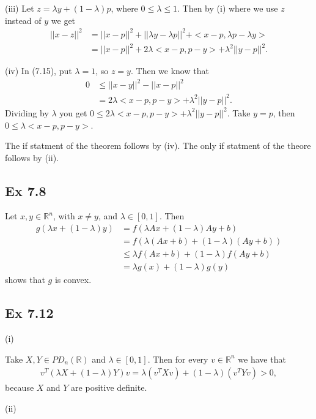\documentclass[letterpaper,12pt]{article}
\theoremstyle{definition}
\begin{document}
\begin{spacing}{1.3}{}
	(iii)
	Let $z=\lambda y+(1-\lambda)p$, where $0\leq\lambda\leq1$.
	Then by (i) where we use $z$ instead of $y$ we get
	\begin{align*}
	    ||x-z||^2 & = ||x-p||^2+||\lambda y-\lambda p||^2 + <x-p,\lambda p-\lambda y>\\
	&= ||x-p||^2+2\lambda<x-p,p-y>+\lambda^2||y-p||^2.
	\end{align*}
	
	(iv)
	In (7.15), put $\lambda=1$, so $z=y$.
	Then we know that
	\begin{align*}
	0&\leq||x-y||^2-||x-p||^2\\
	&=2\lambda<x-p,p-y>+\lambda^2||y-p||^2.
	\end{align*}
	Dividing by $\lambda$ you get $0\leq2\lambda<x-p,p-y>+\lambda^2||y-p||^2$.
	Take $y=p$, then $0\leq\lambda<x-p,p-y>$.
	
	The if statment of the theorem follows by (iv).
	The only if statment of the theore follows by (ii).
	
	\subsection*{Ex 7.8}
	Let $x, y\in\mathbb R^n$, with $x\neq y$, and $\lambda\in[0,1]$.
	Then
	\begin{align*}
	g(\lambda x+(1-\lambda)y)&= f(\lambda Ax + (1-\lambda)Ay + b)\\
	 &= f(\lambda(Ax+b) + (1-\lambda)(Ay+b))\\
	&\leq\lambda f(Ax+b) + (1-\lambda)f(Ay+b)\\
	& = \lambda g(x) + (1-\lambda)g(y)
	\end{align*}
	shows that $g$ is convex.
	
	\subsection*{Ex 7.12}
	(i)
	
	Take $X,Y\in PD_n(\mathbb R)$ and $\lambda\in[0,1]$.
	Then for every $v\in\mathbb R^n$ we have that
	\begin{align*}
	v^T(\lambda X+(1-\lambda)Y)v=
	\lambda(v^TXv)+(1-\lambda)(v^TYv)>0,
	\end{align*}
	because $X$ and $Y$ are positive definite.
	
	(ii)
	

\end{spacing}
\end{document}
